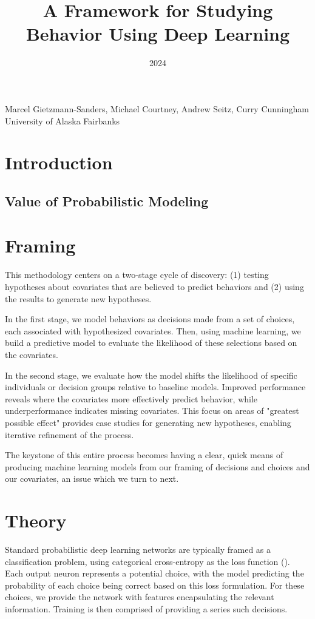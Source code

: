 \documentclass[11pt]{article}
\title{A Framework for Studying Behavior Using Deep Learning}
\date{2024}
\makeatletter
\renewcommand{\maketitle}{
\begin{center}

\pagestyle{empty}

{\LARGE \bf \@title\par}
\vspace{1cm}

{\Large Marcel Gietzmann-Sanders, Michael Courtney, Andrew Seitz, Curry Cunningham}\\[1cm]

University of Alaska Fairbanks


\end{center}
}\makeatother
\makeatother
\begin{document}
\maketitle

\section*{Introduction}

\subsection*{Value of Probabilistic Modeling}

\section*{Framing}

This methodology centers on a two-stage cycle of discovery: (1) testing hypotheses about covariates that are believed to predict behaviors and (2) using the results to generate new hypotheses.

In the first stage, we model behaviors as decisions made from a set of choices, each associated with hypothesized covariates. Then, using machine learning, we build a predictive model to evaluate the likelihood of these selections based on the covariates.

In the second stage, we evaluate how the model shifts the likelihood of specific individuals or decision groups relative to baseline models. Improved performance reveals where the covariates more effectively predict behavior, while underperformance indicates missing covariates. This focus on areas of "greatest possible effect" provides case studies for generating new hypotheses, enabling iterative refinement of the process.

The keystone of this entire process becomes having a clear, quick means of producing machine learning models from our framing of decisions and choices and our covariates, an issue which we turn to next. 

\section*{Theory}

Standard probabilistic deep learning networks are typically framed as a classification problem, using categorical cross-entropy as the loss function (\cite{durr}). Each output neuron represents a potential choice, with the model predicting the probability of each choice being correct based on this loss formulation. For these choices, we provide the network with features encapsulating the relevant information. Training is then comprised of providing a series such decisions. 
\end{document}
